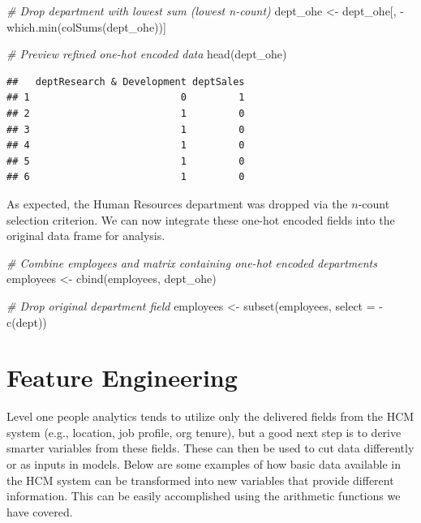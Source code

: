 \documentclass[
]{book}
\newenvironment{Shaded}{\begin{snugshade}}{\end{snugshade}}
\newcommand{\AttributeTok}[1]{\textcolor[rgb]{0.77,0.63,0.00}{#1}}
\newcommand{\CommentTok}[1]{\textcolor[rgb]{0.56,0.35,0.01}{\textit{#1}}}
\newcommand{\FunctionTok}[1]{\textcolor[rgb]{0.00,0.00,0.00}{#1}}
\newcommand{\NormalTok}[1]{#1}
\newcommand{\OtherTok}[1]{\textcolor[rgb]{0.56,0.35,0.01}{#1}}
\newcommand{\SpecialCharTok}[1]{\textcolor[rgb]{0.00,0.00,0.00}{#1}}
\begin{document}
\begin{Shaded}
\begin{Highlighting}[]
\CommentTok{\# Drop department with lowest sum (lowest n{-}count)}
\NormalTok{dept\_ohe }\OtherTok{\textless{}{-}}\NormalTok{ dept\_ohe[, }\SpecialCharTok{{-}}\FunctionTok{which.min}\NormalTok{(}\FunctionTok{colSums}\NormalTok{(dept\_ohe))]}

\CommentTok{\# Preview refined one{-}hot encoded data}
\FunctionTok{head}\NormalTok{(dept\_ohe)}
\end{Highlighting}
\end{Shaded}

\begin{verbatim}
##   deptResearch & Development deptSales
## 1                          0         1
## 2                          1         0
## 3                          1         0
## 4                          1         0
## 5                          1         0
## 6                          1         0
\end{verbatim}

As expected, the Human Resources department was dropped via the \(n\)-count selection criterion. We can now integrate these one-hot encoded fields into the original data frame for analysis.

\begin{Shaded}
\begin{Highlighting}[]
\CommentTok{\# Combine employees and matrix containing one{-}hot encoded departments}
\NormalTok{employees }\OtherTok{\textless{}{-}} \FunctionTok{cbind}\NormalTok{(employees, dept\_ohe)}

\CommentTok{\# Drop original department field}
\NormalTok{employees }\OtherTok{\textless{}{-}} \FunctionTok{subset}\NormalTok{(employees, }\AttributeTok{select =} \SpecialCharTok{{-}}\FunctionTok{c}\NormalTok{(dept))}
\end{Highlighting}
\end{Shaded}

\hypertarget{feature-engineering}{%
\section{Feature Engineering}\label{feature-engineering}}

Level one people analytics tends to utilize only the delivered fields from the HCM system (e.g., location, job profile, org tenure), but a good next step is to derive smarter variables from these fields. These can then be used to cut data differently or as inputs in models. Below are some examples of how basic data available in the HCM system can be transformed into new variables that provide different information. This can be easily accomplished using the arithmetic functions we have covered.
\end{document}
